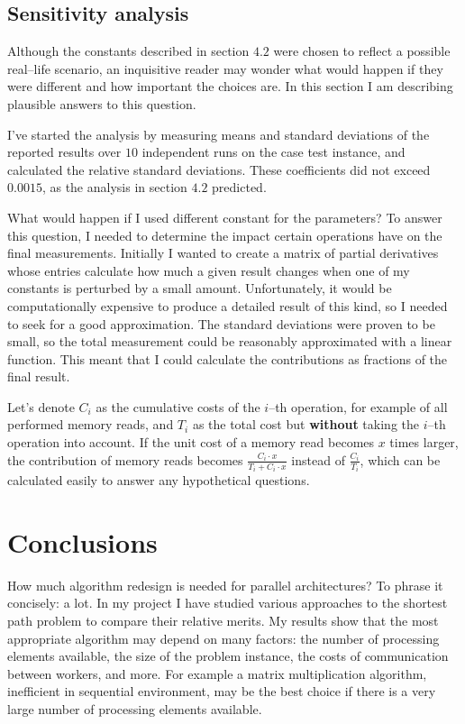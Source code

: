 \documentclass[12pt,a4paper,oneside,openright]{report}
\begin{document}
\section{Sensitivity analysis}
Although the constants described in section $4.2$ were chosen to reflect a possible real--life scenario, an inquisitive reader may wonder what would happen if they were different and how important the choices are. In this section I am describing plausible answers to this question.

I've started the analysis by measuring means and standard deviations of the reported results over $10$ independent runs on the case test instance, and calculated the relative standard deviations. These coefficients did not exceed $0.0015$, as the analysis in section $4.2$ predicted.

What would happen if I used different constant for the parameters? To answer this question, I needed to determine the impact certain operations have on the final measurements. Initially I wanted to create a matrix of partial derivatives whose entries calculate how much a given result changes when one of my constants is perturbed by a small amount. Unfortunately, it would be computationally expensive to produce a detailed result of this kind, so I needed to seek for a good approximation. The standard deviations were proven to be small, so the total measurement could be reasonably approximated with a linear function. This meant that I could calculate the contributions as fractions of the final result.

Let's denote $C_i$ as the cumulative costs of the $i$--th operation, for example of all performed memory reads, and $T_i$ as the total cost but \textbf{without} taking the $i$--th operation into account. If the unit cost of a memory read becomes $x$ times larger, the contribution of memory reads becomes $\frac{C_i\cdot x}{T_i + C_i\cdot x}$ instead of $\frac{C_i}{T_i}$, which can be calculated easily to answer any hypothetical questions.



\chapter{Conclusions}
How much algorithm redesign is needed for parallel architectures? To phrase it concisely: a lot. In my project I have studied various approaches to the shortest path problem to compare their relative merits. My results show that the most appropriate algorithm may depend on many factors: the number of processing elements available, the size of the problem instance, the costs of communication between workers, and more. For example a matrix multiplication algorithm, inefficient in sequential environment, may be the best choice if there is a very large number of processing elements available.
\end{document}
